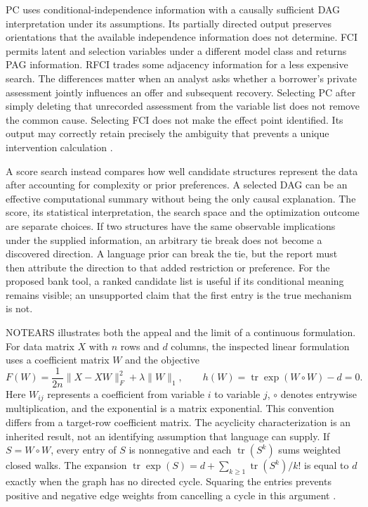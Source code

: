 PC uses conditional-independence information with a causally sufficient DAG
interpretation under its assumptions. Its partially directed output preserves
orientations that the available independence information does not determine.
FCI permits latent and selection variables under a different model class and
returns PAG information. RFCI trades some adjacency information for a less
expensive search. The differences matter when an analyst asks whether a
borrower's private assessment jointly influences an offer and subsequent
recovery. Selecting PC after simply deleting that unrecorded assessment from
the variable list does not remove the common cause. Selecting FCI does not
make the effect point identified. Its output may correctly retain precisely
the ambiguity that prevents a unique intervention calculation
\citep{exec13_latentr_colombo2012,exec14_java_latent_sources}.

A score search instead compares how well candidate structures represent the
data after accounting for complexity or prior preferences. A selected DAG
can be an effective computational summary without being the only causal
explanation. The score, its statistical interpretation, the search space and
the optimization outcome are separate choices. If two structures have the
same observable implications under the supplied information, an arbitrary
tie break does not become a discovered direction. A language prior can break
the tie, but the report must then attribute the direction to that added
restriction or preference. For the proposed bank tool, a ranked candidate
list is useful if its conditional meaning remains visible; an unsupported
claim that the first entry is the true mechanism is not.

NOTEARS illustrates both the appeal and the limit of a continuous formulation.
For data matrix $X$ with $n$ rows and $d$ columns, the inspected linear
formulation uses a coefficient matrix $W$ and the objective
\[
 F(W)=\frac{1}{2n}\lVert X-XW\rVert_F^2+\lambda\lVert W\rVert_1,
 \qquad h(W)=\operatorname{tr}\exp(W\circ W)-d=0.
\]
Here $W_{ij}$ represents a coefficient from variable $i$ to variable $j$,
$\circ$ denotes entrywise multiplication, and the exponential is a matrix
exponential. This convention differs from a target-row coefficient matrix.
The acyclicity characterization is an inherited result, not an identifying
assumption that language can supply. If $S=W\circ W$, every entry of $S$
is nonnegative and each $\operatorname{tr}(S^k)$ sums weighted closed walks.
The expansion $\operatorname{tr}\exp(S)=d+\sum_{k\geq1}
\operatorname{tr}(S^k)/k!$ is equal to $d$ exactly when the graph has no
directed cycle. Squaring the entries prevents positive and negative edge
weights from cancelling a cycle in this argument
\citep{notears2018}.

